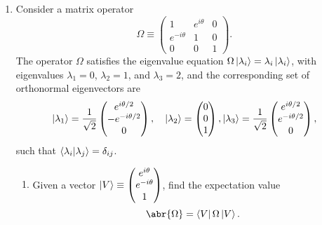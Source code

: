 \documentclass[11pt]{article}
\begin{document}
\begin{enumerate}[label=25.\arabic*]
    \item Consider a matrix operator \[\Omega \equiv \begin{pmatrix}
        1 & e^{i\theta} & 0 \\
        e^{-i\theta} & 1 & 0 \\
        0 & 0 & 1
    \end{pmatrix}.\] The operator $\Omega$ satisfies the eigenvalue equation $\Omega\ket{\lambda_i} = \lambda_i\ket{\lambda_i}$, with eigenvalues $\lambda_1 = 0$, $\lambda_2 = 1$, and $\lambda_3 = 2$, and the corresponding set of orthonormal eigenvectors are \[\ket{\lambda_1} = \frac{1}{\sqrt{2}}\begin{pmatrix}
        e^{i\theta/2}\\-e^{-i\theta/2}\\0
    \end{pmatrix}, \quad \ket{\lambda_2} = \begin{pmatrix}
        0\\0\\1
    \end{pmatrix},\ket{\lambda_3} = \frac{1}{\sqrt{2}}\begin{pmatrix}
        e^{i\theta/2}\\e^{-i\theta/2}\\0
    \end{pmatrix},\] such that $\bra{\lambda_i}\ket{\lambda_j} = \delta_{ij}$.\begin{enumerate}[label=(\alph*)]
        \item Given a vector $\ket{V} \equiv \begin{pmatrix}
            e^{i\theta}\\e^{-i\theta}\\1
        \end{pmatrix}$, find the expectation value\[\abr{\Omega} = \bra{V}\Omega\ket{V}.\]


\end{enumerate}
\end{enumerate}
\end{document}
